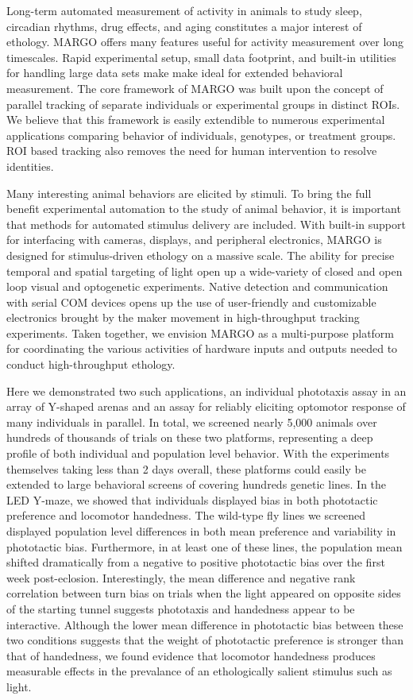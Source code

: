 \documentclass[10pt]{article}
\begin{document}
\begin{multicols}{2}
Long-term automated measurement of activity in animals to study sleep, circadian rhythms, drug effects, and aging constitutes a major interest of ethology. MARGO offers many features useful for activity measurement over long timescales. Rapid experimental setup, small data footprint, and built-in utilities for handling large data sets make make ideal for extended behavioral measurement. The core framework of MARGO was built upon the concept of parallel tracking of separate individuals or experimental groups in distinct ROIs. We believe that this framework is easily extendible to numerous experimental applications comparing behavior of individuals, genotypes, or treatment groups. ROI based tracking also removes the need for human intervention to resolve identities.  

Many interesting animal behaviors are elicited by stimuli. To bring the full benefit experimental automation to the study of animal behavior, it is important that methods for automated stimulus delivery are included. With built-in support for interfacing with cameras, displays, and peripheral electronics, MARGO is designed for stimulus-driven ethology on a massive scale. The ability for precise temporal and spatial targeting of light open up a wide-variety of closed and open loop visual and optogenetic experiments. Native detection and communication with serial COM devices opens up the use of user-friendly and customizable electronics brought by the maker movement in high-throughput tracking experiments. Taken together, we envision MARGO as a multi-purpose platform for coordinating the various activities of hardware inputs and outputs needed to conduct high-throughput ethology. 

Here we demonstrated two such applications, an individual phototaxis assay in an array of Y-shaped arenas and an assay for reliably eliciting optomotor response of many individuals in parallel. In total, we screened nearly 5,000 animals over hundreds of thousands of trials on these two platforms, representing a deep profile of both individual and population level behavior. With the experiments themselves taking less than 2 days overall, these platforms could easily be extended to large behavioral screens of covering hundreds genetic lines. In the LED Y-maze, we showed that individuals displayed bias in both phototactic preference and locomotor handedness. The wild-type fly lines we screened displayed population level differences in both mean preference and variability in phototactic bias. Furthermore, in at least one of these lines, the population mean shifted dramatically from a negative to positive phototactic bias over the first week post-eclosion. Interestingly, the mean difference and negative rank correlation between turn bias on trials when the light appeared on opposite sides of the starting tunnel suggests phototaxis and handedness appear to be interactive. Although the lower mean difference in phototactic bias between these two conditions suggests that the weight of phototactic preference is stronger than that of handedness, we found evidence that locomotor handedness produces measurable effects in the prevalance of an ethologically salient stimulus such as light. 


\end{multicols}
\end{document}
